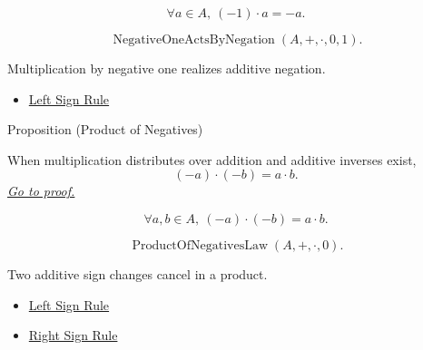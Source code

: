 \begin{remark*}
\[
\forall a\in A,\ (-1)\cdot a=-a.
\]
\end{remark*}

\begin{remark*}
\[
\operatorname{NegativeOneActsByNegation}(A,+,\cdot,0,1).
\]
\end{remark*}

\begin{remark*}[Interpretation]
Multiplication by negative one realizes additive negation.
\end{remark*}

\begin{dependencies}
\begin{itemize}
  \item \hyperref[prop:left-sign-rule]{Left Sign Rule
}
\end{itemize}
\end{dependencies}

\begin{propositionbox}{Proposition (Product of Negatives)}
\begin{proposition}
\label{prop:product-of-negatives}
When multiplication distributes over addition and additive inverses exist,
\[
(-a)\cdot(-b)=a\cdot b.
\]
\hyperref[prf:product-of-negatives]{\textit{Go to proof.}}
\end{proposition}
\end{propositionbox}

\begin{remark*}
\[
\forall a,b\in A,\ (-a)\cdot(-b)=a\cdot b.
\]
\end{remark*}

\begin{remark*}
\[
\operatorname{ProductOfNegativesLaw}(A,+,\cdot,0).
\]
\end{remark*}

\begin{remark*}[Interpretation]
Two additive sign changes cancel in a product.
\end{remark*}

\begin{dependencies}
\begin{itemize}
  \item \hyperref[prop:left-sign-rule]{Left Sign Rule}
  \item \hyperref[prop:right-sign-rule]{Right Sign Rule}
\end{itemize}
\end{dependencies}

